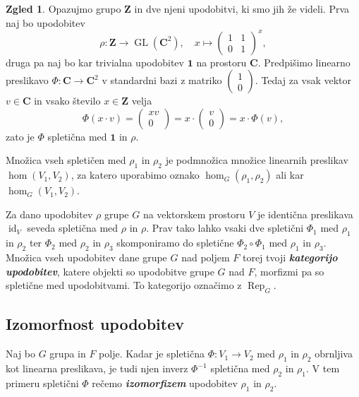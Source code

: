 \documentclass[11pt]{book}
\def\ZZ{\mathbf{Z}}
\def\CC{\mathbf{C}}
\def\11{\mathbf{1}}
\DeclareMathOperator\Rep{Rep}
\DeclareMathOperator\GL{GL}
\DeclareMathOperator\id{id}
\def\definicija{\color{rdeca}\bf\em}
\theoremstyle{definition}
\theoremstyle{zgled}
\newtheorem*{zgled}{Zgled}
\theoremstyle{odprtproblem}
\theoremstyle{domacanaloga}
\theoremstyle{izrek}
\begin{document}
\begin{zgled}
Opazujmo grupo $\ZZ$ in dve njeni upodobitvi, ki smo jih že videli. Prva naj bo upodobitev
\[
    \rho \colon \ZZ \to \GL(\CC^2), \quad
    x \mapsto \left( \begin{smallmatrix} 1 & 1 \\ 0 & 1 \end{smallmatrix} \right)^x,
\]
druga pa naj bo kar trivialna upodobitev $\11$ na prostoru $\CC$. Predpišimo linearno preslikavo $\Phi \colon \CC \to \CC^2$ v standardni bazi z matriko $\left( \begin{smallmatrix} 1 \\ 0 \end{smallmatrix} \right)$. Tedaj za vsak vektor $v \in \CC$ in vsako število $x \in \ZZ$ velja
\[
    \Phi(x \cdot v) 
    = \left( \begin{smallmatrix} xv \\ 0 \end{smallmatrix} \right)
    = x \cdot \left( \begin{smallmatrix} v \\ 0 \end{smallmatrix} \right)
    = x \cdot \Phi(v),
\]
zato je $\Phi$ spletična med $\11$ in $\rho$.
\end{zgled}

Množica vseh spletičen med $\rho_1$ in $\rho_2$ je podmnožica množice linearnih preslikav $\hom(V_1, V_2)$, za katero uporabimo oznako $\hom_G(\rho_1, \rho_2)$ ali kar $\hom_G(V_1, V_2)$.

Za dano upodobitev $\rho$ grupe $G$ na vektorskem prostoru $V$ je identična preslikava $\id_V$ seveda spletična med $\rho$ in $\rho$. Prav tako lahko vsaki dve spletični $\Phi_1$ med $\rho_1$ in $\rho_2$ ter $\Phi_2$ med $\rho_2$ in $\rho_3$ skomponiramo do spletične $\Phi_2 \circ \Phi_1$ med $\rho_1$ in $\rho_3$. Množica vseh upodobitev dane grupe $G$ nad poljem $F$ torej tvoji {\definicija kategorijo upodobitev}, katere objekti so upodobitve grupe $G$ nad $F$, morfizmi pa so spletične med upodobitvami. To kategorijo označimo z $\Rep_G$.

\subsection{Izomorfnost upodobitev}

Naj bo $G$ grupa in $F$ polje. Kadar je spletična $\Phi \colon V_1 \to V_2$ med $\rho_1$ in $\rho_2$ obrnljiva kot linearna preslikava, je tudi njen inverz $\Phi^{-1}$ spletična med $\rho_2$ in $\rho_1$. V tem primeru spletični $\Phi$ rečemo {\definicija izomorfizem} upodobitev $\rho_1$ in $\rho_2$. 
\end{document}
